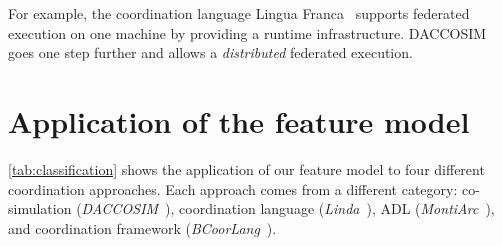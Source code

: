 \documentclass[runningheads]{llncs}
\begin{document}
For example, the coordination language Lingua Franca~\cite{lohstrohReactorsDeterministicModel2020} supports federated execution on one machine by providing a runtime infrastructure.
DACCOSIM~\cite{galtierFMIBasedDistributedMultisimulation2015} goes one step further and allows a \textit{distributed} federated execution.


\section{Application of the feature model} \label{sec: application}
\autoref{tab:classification} shows the application of our feature model to four different coordination approaches.
Each approach comes from a different category: co-simulation (\textit{DACCOSIM}~\cite{galtierFMIBasedDistributedMultisimulation2015,dadSynthesisFeedbackDistribution2021}), coordination language (\textit{Linda}~\cite{carrieroLindaContext1989,carrieroLindaAlternativeMessagepassing1994}), ADL (\textit{MontiArc}~\cite{haberMontiArcArchitecturalModeling2014}), and coordination framework (\textit{BCoorLang}~\cite{krauterBehavioralConsistencyHeterogeneous2021,krauterBehavioralConsistencyMultimodeling2023}).
\end{document}
